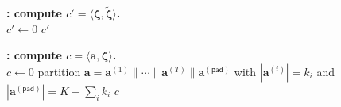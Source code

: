 \begin{algorithm}[!t]
\BlankLine
\textbf{\KwIP: compute $c'=\langle\bm{\zeta},\widetilde{\bm{\zeta}}\rangle$.}\\
$c'\leftarrow0$\;
\Return $c'$\;

\BlankLine
\textbf{\KwIPMix: compute $c=\langle\bm{a},\bm{\zeta}\rangle$.}\\
$c\leftarrow0$\; partition
$\bm{a}=\bm{a}^{(1)}\|\cdots\|\bm{a}^{(T)}\|\bm{a}^{(\mathsf{pad})}$
with $|\bm{a}^{(i)}|=k_i$ and
$|\bm a^{(\mathsf{pad})}|=K-\sum_i k_i$\;
\Return $c$\;
\end{algorithm}
